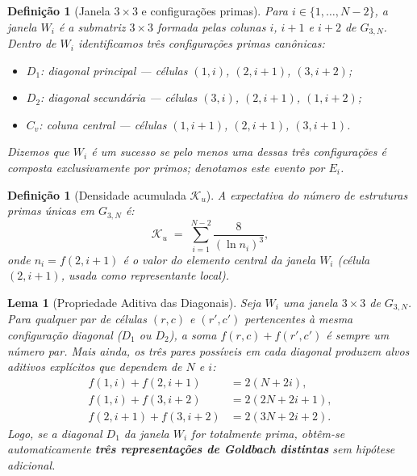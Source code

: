 \documentclass{article}
\newtheorem{lemma}[proposition]{Lema}
\newtheorem{definition}[proposition]{Definição}
\begin{document}
	\begin{definition}[Janela $3\times 3$ e configurações primas]
		\label{def:janela}
		Para $i \in \{1,\ldots, N-2\}$, a \emph{janela} $W_i$ é a
		submatriz $3 \times 3$ formada pelas colunas $i$, $i+1$ e $i+2$
		de $G_{3,N}$. Dentro de $W_i$ identificamos três
		\emph{configurações primas canônicas}:
		\begin{itemize}
			\item $D_1$: diagonal principal — células $(1,i)$, $(2,i+1)$,
			$(3,i+2)$;
			\item $D_2$: diagonal secundária — células $(3,i)$, $(2,i+1)$,
			$(1,i+2)$;
			\item $C_v$: coluna central — células $(1,i+1)$, $(2,i+1)$,
			$(3,i+1)$.
		\end{itemize}
		Dizemos que $W_i$ é um \emph{sucesso} se pelo menos uma dessas
		três configurações é composta exclusivamente por primos; denotamos
		este evento por $E_i$.
	\end{definition}
	
	\begin{definition}[Densidade acumulada $\mathcal{K}_u$]
		\label{def:ku}
		A \emph{expectativa do número de estruturas primas únicas} em
		$G_{3,N}$ é:
		\[
		\mathcal{K}_u \;=\; \sum_{i=1}^{N-2} \frac{8}{(\ln n_i)^3},
		\]
		onde $n_i = f(2, i+1)$ é o valor do elemento central da janela
		$W_i$ (célula $(2, i+1)$, usada como representante local).
	\end{definition}
	
	\begin{lemma}[Propriedade Aditiva das Diagonais]
		\label{lem:aditiva}
		Seja $W_i$ uma janela $3 \times 3$ de $G_{3,N}$. Para qualquer
		par de c\'elulas $(r, c)$ e $(r', c')$ pertencentes \`a mesma
		configura\c{c}\~ao diagonal ($D_1$ ou $D_2$), a soma
		$f(r,c) + f(r',c')$ \'e sempre um n\'umero par.
		Mais ainda, os tr\^es pares poss\'iveis em cada diagonal produzem
		alvos aditivos expl\'icitos que dependem de $N$ e $i$:
		\begin{align}
			f(1,i) + f(2,i+1) &= 2(N + 2i), \label{eq:par12} \\
			f(1,i) + f(3,i+2) &= 2(2N + 2i + 1), \label{eq:par13} \\
			f(2,i+1) + f(3,i+2) &= 2(3N + 2i + 2). \label{eq:par23}
		\end{align}
		Logo, se a diagonal $D_1$ da janela $W_i$ for totalmente prima,
		obt\^em-se automaticamente \textbf{tr\^es representa\c{c}\~oes de
			Goldbach distintas} sem hip\'otese adicional.
	\end{lemma}
	
\end{document}
